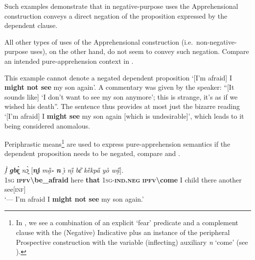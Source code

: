 \documentclass[output=paper,colorlinks,citecolor=brown
]{langscibook}
\begin{document}
Such examples demonstrate that in negative-purpose uses the Apprehensional construction conveys a direct negation of the proposition expressed by the dependent clause.

All other types of uses of the Apprehensional construction (i.e.\ non-negative-purpose uses), on the other hand, do not seem to convey such negation. Compare an intended pure-apprehension context in .


\z

\noindent This example cannot denote a negated dependent proposition `[I'm afraid] I \textbf{might not see} my son again'. A commentary was given by the speaker: ``[It sounds like] `I don't want to see my son anymore'; this is strange, it's as if we wished his death''. The sentence thus provides at most just the bizarre reading `[I'm afraid] I \textbf{might see} my son again [which is undesirable]', which leads to it being considered anomalous.

Periphrastic means\footnote{In , we see a combination of an explicit `fear' predicate and a complement clause with the (Negative) Indicative plus an instance of the peripheral Prospective construction with the variable (inflecting) auxiliary \textit{n{\ù}} `come' (see ).} are used to express pure-apprehension semantics if the dependent proposition needs to be negated, compare  and .

\ea \label{ex:Fed71prime}
\gll \textit{Ḭ̀} \textit{\textbf{gbɛ̰̀}} \textit{nɔ̰̀} \textup{[}\textit{\textbf{nı̰́}} \textit{mȁ̰\textbf{-{\à}}} \textit{\textbf{n{\ù}}} \textit{ı̰̀} \textit{nı̰̋} \textit{bɛ̏} \textit{kȅkpa̋} \textit{yò wa̰̋}\textup{]}\textit{.}\\
\textsc{1sg} \textsc{\textbf{ipfv\backslash}}\textbf{be\_afraid} here \textbf{that} \textsc{1sg-\textbf{ind.neg}} \textbf{\textsc{ipfv\backslash}come} I child there another see[\textsc{inf}] \\
 `--- I'm afraid I \textbf{might not see} my son again.'
\z
\end{document}
